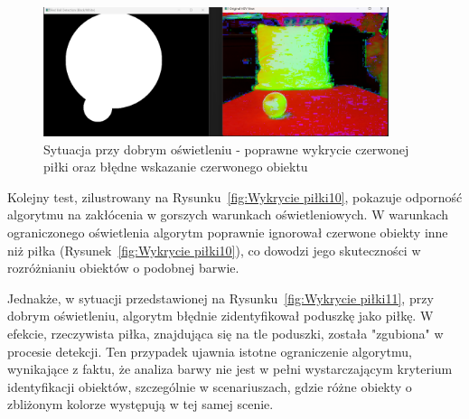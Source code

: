 \documentclass[a4paper,twoside,12pt]{book}
\begin{document}
\begin{figure}[h]
    \centering
    \includegraphics[width=0.9\textwidth]{Images/Porownanie/Binaryzacja/Zrzut ekranu 2025-01-02 193858.png}
    \caption{Sytuacja przy dobrym oświetleniu - poprawne wykrycie czerwonej piłki oraz błędne wskazanie czerwonego obiektu}
    \label{fig:Wykrycie piłki9}
\end{figure}

\newpage

Kolejny test, zilustrowany na Rysunku~\ref{fig:Wykrycie piłki10}, pokazuje odporność algorytmu na zakłócenia w gorszych warunkach oświetleniowych. W warunkach ograniczonego oświetlenia algorytm poprawnie ignorował czerwone obiekty inne niż piłka (Rysunek~\ref{fig:Wykrycie piłki10}), co dowodzi jego skuteczności w rozróżnianiu obiektów o podobnej barwie. 

Jednakże, w sytuacji przedstawionej na Rysunku~\ref{fig:Wykrycie piłki11}, przy dobrym oświetleniu, algorytm błędnie zidentyfikował poduszkę jako piłkę. W efekcie, rzeczywista piłka, znajdująca się na tle poduszki, została "zgubiona" w procesie detekcji. Ten przypadek ujawnia istotne ograniczenie algorytmu, wynikające z faktu, że analiza barwy nie jest w pełni wystarczającym kryterium identyfikacji obiektów, szczególnie w scenariuszach, gdzie różne obiekty o zbliżonym kolorze występują w tej samej scenie.
\end{document}
